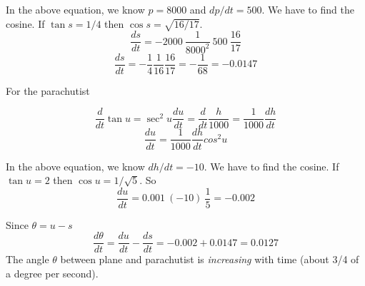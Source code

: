 \documentclass[11pt, oneside]{article}
\begin{document}
In the above equation, we know $p=8000$ and $dp/dt = 500$.  We have to find the cosine.  If $\tan s=1/4$ then $\cos s = \sqrt{16/17}$.  
\[ \frac{ds}{dt} = -2000 \ \frac{1}{8000^2} \ 500 \ \frac{16}{17} \]
\[ \frac{ds}{dt} = -\frac{1}{4} \frac{1}{16} \frac{16}{17} = -\frac{1}{68} = - 0.0147\]

For the parachutist

\[ \frac{d}{dt} \tan u = \sec^2 u \frac{du}{dt} = \frac{d}{dt} \frac{h}{1000}  = \frac{1}{1000} \frac{dh}{dt}  \]
\[ \frac{du}{dt} = \frac{1}{1000} \frac{dh}{dt}  cos^2 u \]

In the above equation, we know $dh/dt = -10$.  We have to find the cosine.  If $\tan u=2$ then $\cos u = 1/\sqrt{5}$.  So
\[ \frac{du}{dt} = 0.001 \  (-10) \ \frac{1}{5}  = - 0.002 \]

Since $\theta = u - s$
\[ \frac{d \theta}{dt} = \frac{du}{dt} -  \frac{ds}{dt} = - 0.002 + 0.0147 =  0.0127 \]
The angle $\theta$ between plane and parachutist is \emph{increasing} with time (about 3/4 of a degree per second).
\end{document}

